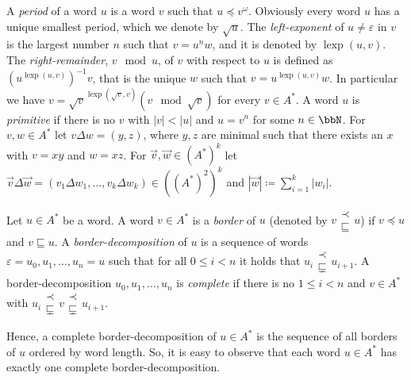\documentclass[a4paper,numberwithinsect,USenglish]{lipics-v2018}
\theoremstyle{plain}
\newtheorem{observation}[theorem]{Observation}
\theoremstyle{remark}
\DeclareMathOperator{\lexp}{lexp}
\newcommand{\presuf}{\mathbin{\substack{{\prec}\\{\sqsubsetneq}}}}
\newcommand{\presufeq}{\mathbin{\substack{{\prec}\\{\sqsubseteq}}}}
\renewcommand{\root}[1]{\sqrt{#1}}
\renewcommand{\epsilon}{\varepsilon}
\begin{document}
A \emph{period} of a word $u$ is a word $v$ such that $u \preceq v^\omega$. Obviously every word $u$ has a unique smallest period, which we denote by $\root{u}$. The \emph{left-exponent} of $u\neq\varepsilon$ in $v$ is the largest number $n$ such that $v= u^nw$, and it is denoted by $\lexp(u,v)$. The \emph{right-remainder}, $v\mod u$,  of $v$ with respect to $u$ is defined as $(u^{\lexp(u,v)})^{-1}v$, that is the unique $w$ such that $v= u^{\lexp(u,v)}w$.  In particular we have $v= \root{v}^{\lexp(\root{v}, v)}(v \mod \root{v})$ for every $v\in A^\ast$. A word $u$ is \emph{primitive} if there is no $v$ with
$|v| < |u|$ and $u = v^n$ for some $n\in\bbN$.
For $v,w\in A^\ast$ let $v\Delta w = (y,z)$, where $y,z$ are minimal such that there exists an $x$ with $v=xy$ and $w=xz$. For $\vec{v}, \vec{w}\in(A^\ast)^k$ let 
$\vec{v}\Delta\vec{w} = (v_1\Delta w_1,\ldots, v_k\Delta w_k) \in ((A^\ast)^2)^k$ and $|\vec{w}| \coloneq \sum_{i=1}^{k}|w_i|$. 

\begin{definition}
	Let $u\in A^\ast$ be a word. A word $v\in A^*$ is a \emph{border} of $u$ (denoted by $v\presufeq u$) if $v \preceq u$ and $v \sqsubseteq u$. A \emph{border-decomposition} of $u$ is a sequence of words $\epsilon = u_0,u_1,\ldots, u_n = u$ such that for all $0\leq i < n$ it holds that
	$u_i \presuf u_{i+1}$. A border-decomposition $u_0,u_1,\ldots, u_n $ is \emph{complete} if there is no $1\leq i< n$ and $v\in A^\ast$ with $u_i \presuf v \presuf u_{i+1}$.
\end{definition}

Hence, a complete border-decomposition of $u\in A^*$ is the sequence of all borders of $u$ ordered by word length. So, it is easy to observe that each word $u\in A^*$ has exactly one complete border-decomposition.

\end{document}
